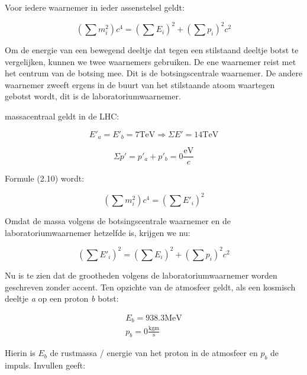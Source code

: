 Voor iedere waarnemer in ieder assenstelsel geldt:

\begin{equation}
\left(\sum m_{i}^{2}\right)c^{4}
=\left(\sum E_{i}\right)^{2}+\left(\sum p_{i}\right)^{2}c^{2}
\end{equation}


Om de energie van een bewegend deeltje dat tegen een stilstaand deeltje
botst te vergelijken, kunnen we twee waarnemers gebruiken. De ene
waarnemer reist met het centrum van de botsing mee. Dit is de botsingscentrale
waarnemer. De andere waarnemer zweeft ergens in de buurt van het stilstaande
atoom waartegen gebotst wordt, dit is de laboratoriumwaarnemer.

massacentraal geldt in de LHC:

\begin{equation}
E'_{a}=E'_{b}=7\mathrm{TeV}\Longrightarrow\Sigma E'=\mathrm{14TeV}
\end{equation}


\begin{equation}
\Sigma p'=p'_{a}+p'_{b}=0\frac{\mathrm{eV}}{c}
\end{equation}


Formule (2.10) wordt:

\begin{equation}
\left(\sum m_{i}^{2}\right)c^{4}=\left(\sum E'_{i}\right)^{2}
\end{equation}


Omdat de massa volgens de botsingscentrale waarnemer en de
laboratoriumwaarnemer hetzelfde is, krijgen we nu:

\begin{equation}
\left(\sum E'_{i}\right)^{2}
=\left(\sum E_{i}\right)^{2}+\left(\sum p_{i}\right)^{2}c^{2}
\end{equation}


Nu is te zien dat de grootheden volgens de laboratoriumwaarnemer worden
geschreven zonder accent. Ten opzichte van de atmosfeer geldt, als
een kosmisch deeltje \emph{a} op een proton \emph{b} botst:

\begin{equation}
\begin{array}{c}
E_{b}=938.3\mathrm{MeV}\\
p_{b}=0\mathrm{\frac{kgm}{s}}
\end{array}
\end{equation}


Hierin is $E_{b}$ de rustmassa / energie van het proton in de atmosfeer
en $p_{b}$ de impuls. Invullen geeft:

